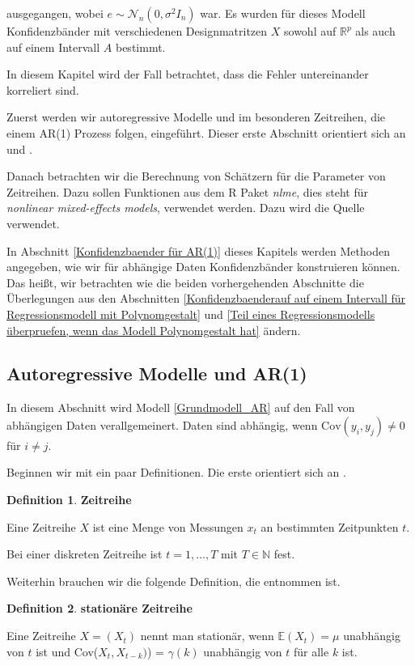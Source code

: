 \documentclass[12pt,a4paper]{article}
\theoremstyle{definition}
\newtheorem{Definition}{Definition}[subsection]
\theoremstyle{definition}
\theoremstyle{definition}
\theoremstyle{definition}
\begin{document}
ausgegangen, wobei $e \sim \mathscr{N}_{n}(0, \sigma^2 I_n)$ war.  Es wurden für dieses Modell Konfidenzbänder mit verschiedenen Designmatritzen $X$ sowohl auf $\mathbb{R}^{p}$ als auch auf einem Intervall $A$ bestimmt.

In diesem Kapitel wird der Fall betrachtet, dass die Fehler untereinander korreliert sind. 

Zuerst werden wir autoregressive Modelle und im besonderen Zeitreihen, die einem AR(1) Prozess folgen, eingeführt. Dieser erste Abschnitt orientiert sich an \cite{Hansen15} und \cite{Brockwell91}.

Danach betrachten wir die Berechnung von Schätzern für die Parameter von Zeitreihen. Dazu sollen Funktionen aus dem R Paket \textit{nlme}, dies steht für \textit{nonlinear mixed-effects models}, verwendet werden. Dazu wird die Quelle \cite{Pinheiro00} verwendet.

In Abschnitt \ref{Konfidenzbaender für AR(1)} dieses Kapitels werden Methoden angegeben, wie wir für abhängige Daten Konfidenzbänder konstruieren können. Das heißt, wir betrachten wie die beiden vorhergehenden Abschnitte die Überlegungen aus den Abschnitten \ref{Konfidenzbaenderauf auf einem Intervall für Regressionsmodell mit Polynomgestalt} und \ref{Teil eines Regressionsmodells überpruefen, wenn das Modell Polynomgestalt hat} ändern.


\subsection{Autoregressive Modelle und AR(1)}
\label{Regression für AR(1)}
In diesem Abschnitt wird Modell \eqref{Grundmodell_AR} auf den Fall von abhängigen Daten verallgemeinert. Daten sind abhängig, wenn $\text{Cov}(y_i,y_j) \neq 0$ für $i \neq j$.

Beginnen wir mit ein paar Definitionen. Die erste orientiert sich an \cite[1]{Brockwell91}.

\begin{Definition}
\textbf{Zeitreihe}

Eine Zeitreihe $X$ ist eine Menge von Messungen $x_t$ an bestimmten Zeitpunkten $t$. 

Bei einer diskreten Zeitreihe ist $ t=1, \ldots, T $ mit $T \in \mathbb{N}$ fest. 
\end{Definition}

Weiterhin brauchen wir die folgende Definition, die \cite{Hansen15} entnommen ist.

\begin{Definition}
\textbf{stationäre Zeitreihe}

Eine Zeitreihe $X = (X_t)$ nennt man stationär, wenn $\mathbb{E}(X_t) = \mu$ unabhängig von $t$ ist und Cov($X_t,X_{t-k})$) = $\gamma (k)$ unabhängig von $t$ für alle $k$ ist.
\end{Definition}
\end{document}
